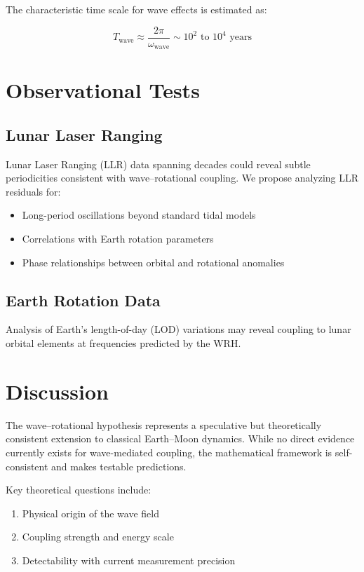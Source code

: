 \documentclass[12pt,a4paper]{article}
\begin{document}
The characteristic time scale for wave effects is estimated as:

\begin{equation}
T_{\text{wave}} \approx \frac{2\pi}{\omega_{\text{wave}}} \sim 10^2 \text{ to } 10^4 \text{ years}
\end{equation}

\section{Observational Tests}

\subsection{Lunar Laser Ranging}

Lunar Laser Ranging (LLR) data spanning decades could reveal subtle periodicities consistent with wave–rotational coupling. We propose analyzing LLR residuals for:

\begin{itemize}
    \item Long-period oscillations beyond standard tidal models
    \item Correlations with Earth rotation parameters
    \item Phase relationships between orbital and rotational anomalies
\end{itemize}

\subsection{Earth Rotation Data}

Analysis of Earth's length-of-day (LOD) variations may reveal coupling to lunar orbital elements at frequencies predicted by the WRH.

\section{Discussion}

The wave–rotational hypothesis represents a speculative but theoretically consistent extension to classical Earth–Moon dynamics. While no direct evidence currently exists for wave-mediated coupling, the mathematical framework is self-consistent and makes testable predictions.

Key theoretical questions include:
\begin{enumerate}
    \item Physical origin of the wave field
    \item Coupling strength and energy scale
    \item Detectability with current measurement precision
\end{enumerate}
\end{document}
